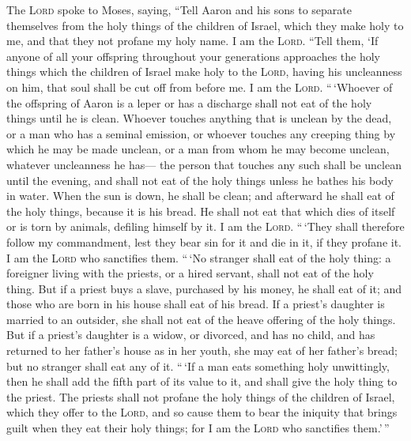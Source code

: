  The \textsc{Lord} spoke to Moses, saying, 
``Tell Aaron and his sons to separate themselves from the holy things of
the children of Israel, which they make holy to me, and that they not
profane my holy name. I am the \textsc{Lord}.  ``Tell
them, `If anyone of all your offspring throughout your generations
approaches the holy things which the children of Israel make holy to the
\textsc{Lord}, having his uncleanness on him, that soul shall be cut off
from before me. I am the \textsc{Lord}.  ``\,`Whoever of
the offspring of Aaron is a leper or has a discharge shall not eat of
the holy things until he is clean. Whoever touches anything that is
unclean by the dead, or a man who has a seminal emission, 
or whoever touches any creeping thing by which he may be made unclean,
or a man from whom he may become unclean, whatever uncleanness he has---
 the person that touches any such shall be unclean until
the evening, and shall not eat of the holy things unless he bathes his
body in water.  When the sun is down, he shall be clean;
and afterward he shall eat of the holy things, because it is his bread.
 He shall not eat that which dies of itself or is torn by
animals, defiling himself by it. I am the \textsc{Lord}. 
``\,`They shall therefore follow my commandment, lest they bear sin for
it and die in it, if they profane it. I am the \textsc{Lord} who
sanctifies them.  ``\,`No stranger shall eat of the holy
thing: a foreigner living with the priests, or a hired servant, shall
not eat of the holy thing.  But if a priest buys a slave,
purchased by his money, he shall eat of it; and those who are born in
his house shall eat of his bread.  If a priest's daughter
is married to an outsider, she shall not eat of the heave offering of
the holy things.  But if a priest's daughter is a widow,
or divorced, and has no child, and has returned to her father's house as
in her youth, she may eat of her father's bread; but no stranger shall
eat any of it.  ``\,`If a man eats something holy
unwittingly, then he shall add the fifth part of its value to it, and
shall give the holy thing to the priest.  The priests
shall not profane the holy things of the children of Israel, which they
offer to the \textsc{Lord},  and so cause them to bear
the iniquity that brings guilt when they eat their holy things; for I am
the \textsc{Lord} who sanctifies them.'\,''

